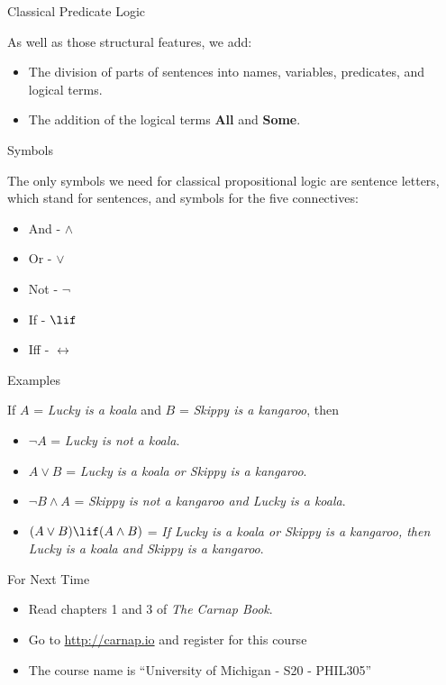 \documentclass[
  ignorenonframetext,
]{beamer}
\providecommand{\tightlist}{%
  \setlength{\itemsep}{0pt}\setlength{\parskip}{0pt}}
\renewcommand{\,}{\text{, }}
\begin{document}
\begin{frame}{Classical Predicate Logic}
\protect\hypertarget{classical-predicate-logic}{}

As well as those structural features, we add:

\begin{itemize}
\tightlist
\item
  The division of parts of sentences into names, variables, predicates,
  and logical terms.
\item
  The addition of the logical terms \textbf{All} and \textbf{Some}.
\end{itemize}

\end{frame}

\begin{frame}{Symbols}
\protect\hypertarget{symbols}{}

The only symbols we need for classical propositional logic are sentence
letters, which stand for sentences, and symbols for the five
connectives:

\begin{itemize}
\tightlist
\item
  And - \(\wedge\)
\item
  Or - \(\vee\)
\item
  Not - \(\neg\)
\item
  If - \(\lif\)
\item
  Iff - \(\leftrightarrow\)
\end{itemize}

\end{frame}

\begin{frame}{Examples}
\protect\hypertarget{examples}{}

If \(A\) = \emph{Lucky is a koala} and \(B\) = \emph{Skippy is a
kangaroo}, then

\begin{itemize}[<+->]
\tightlist
\item
  \(\neg A\) = \emph{Lucky is not a koala}.
\item
  \(A \vee B\) = \emph{Lucky is a koala or Skippy is a kangaroo}.
\item
  \(\neg B \wedge A\) = \emph{Skippy is not a kangaroo and Lucky is a
  koala}.
\item
  \((A \vee B) \lif (A \wedge B)\) = \emph{If Lucky is a koala or Skippy
  is a kangaroo, then Lucky is a koala and Skippy is a kangaroo}.
\end{itemize}

\end{frame}

\begin{frame}{For Next Time}
\protect\hypertarget{for-next-time}{}

\begin{itemize}
\tightlist
\item
  Read chapters 1 and 3 of \emph{The Carnap Book}.
\item
  Go to \url{http://carnap.io} and register for this course
\item
  The course name is ``University of Michigan - S20 - PHIL305''
\end{itemize}

\end{frame}
\end{document}
